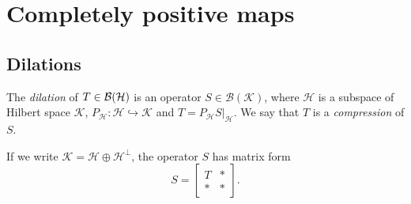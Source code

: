 \section{Completely positive maps}

\subsection{Dilations}

\begin{definition}
    The \emph{dilation} of $T \in \operatorname{\mathcal{B} (\mathcal{H})}$ is an operator $S \in \mathcal{B}(\mathcal{K})$, where 
    $\mathcal{H}$ is a subspace of Hilbert space $\mathcal{K}$, $P_{\mathcal{H}}: \mathcal{H} \hookrightarrow \mathcal{K}$ and $T = P_{\mathcal{H}} S\big|_{\mathcal{H}}$.
    We say that $T$ is a \emph{compression} of $S$.
\end{definition}

If we write $\mathcal{K} = \mathcal{H} \oplus \mathcal{H}^\perp$, the operator $S$ has matrix form 
$$S = \begin{bmatrix}
    T & *\\
    * & *
\end{bmatrix}.$$

